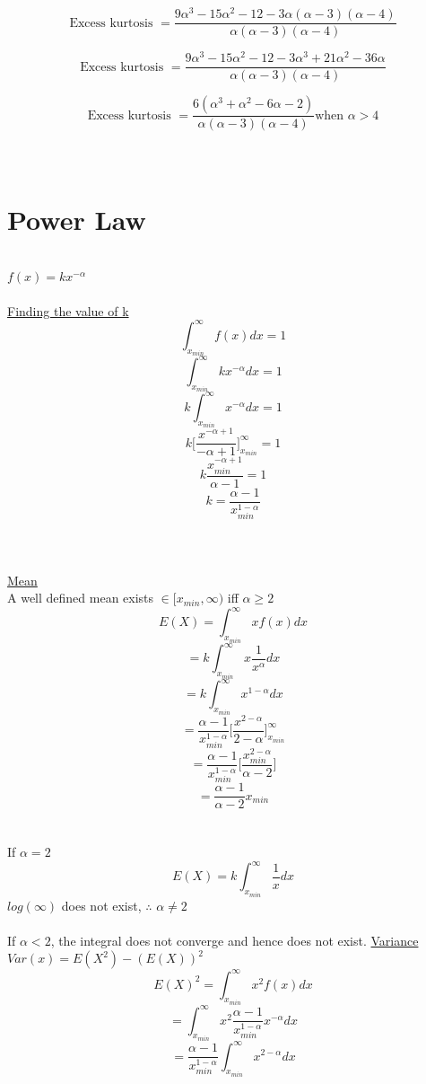 \documentclass[14pt, a4paper]{article}
\theoremstyle{definition}
\begin{document}
\[\text{Excess kurtosis }= \frac{9 \alpha^3 - 15 \alpha^2 - 12 - 3 \alpha (\alpha - 3)(\alpha - 4) }{\alpha (\alpha - 3)(\alpha - 4)}\]

\[\text{Excess kurtosis }= \frac{9 \alpha^3 - 15 \alpha^2 - 12 - 3 \alpha^3 + 21 \alpha^2 - 36 \alpha}{\alpha (\alpha - 3)(\alpha - 4)}\]

\[\text{Excess kurtosis }= \frac{6(\alpha^3 + \alpha^2 - 6 \alpha - 2) }{\alpha (\alpha - 3)(\alpha - 4)} \text{when $\alpha > 4$}\]
\\
\\
\newpage
\section{Power Law}
\\$ f(x) = k x^{-\alpha}$
\\
\\ \underline{Finding the value of k}
\[\int^\infty_{x_{min}} f(x) dx = 1 \]
\[ \int^\infty_{x_{min}} kx^{-\alpha} dx = 1\]
\[ k \int^\infty_{x_{min}} x^{-\alpha} dx = 1\]
\[ k \Big[ \frac{x^{-\alpha +1}}{-\alpha + 1} \Big]^\infty_{x_{min}} = 1\]
\[ k \frac{x_{min}^{-\alpha +1}}{\alpha - 1} = 1\]
\[ k = \frac{\alpha - 1}{x_{min}^{1 -\alpha}}\]
\\
\\
\\ \underline{Mean} 
\\ A well defined mean exists $ \in [x_{min}, \infty )$ iff $\alpha \geq 2$ 
\[ E(X) = \int^\infty_{x_{min}} x f(x) dx \]
\[ = k \int^\infty_{x_{min}} x \frac{1}{x^\alpha} dx\]
\[ = k \int^\infty_{x_{min}} x^{1-\alpha} dx\]
\[ = \frac{\alpha - 1}{x_{min}^{1 -\alpha}} \Big[ \frac{x^{2 -\alpha}}{2 - \alpha } \Big]^\infty_{x_{min}} \]
\[ = \frac{\alpha - 1}{x_{min}^{1 -\alpha}} \Big[ \frac{x_{min}^{2 -\alpha}}{\alpha -2 } \Big] \]
\[ = \frac{\alpha - 1}{\alpha - 2} x_{min}\]
\\
\\ If $\alpha = 2$ \[ E(X) = k \int^\infty_{x_{min}} \frac{1}{x} dx \]
$log(\infty)$ does not exist, $\therefore$ $\alpha \neq 2$
\\
\\ If $\alpha < 2$, the integral does not converge and hence does not exist.
\newpage
\underline{Variance} 
\\ $Var(x) = E(X^2) - (E(X))^2$
\\ \[ E(X)^2  = \int^\infty_{x_{min}} x^2 f(x) dx\]
\[  =  \int^\infty_{x_{min}} x^2 \frac{\alpha - 1 }{x_{min}^{1-\alpha}}x^{-\alpha} dx\]
\[  =  \frac{\alpha - 1 }{x_{min}^{1-\alpha}} \int^\infty_{x_{min}} x^{2 -\alpha} dx\]
\end{document}
